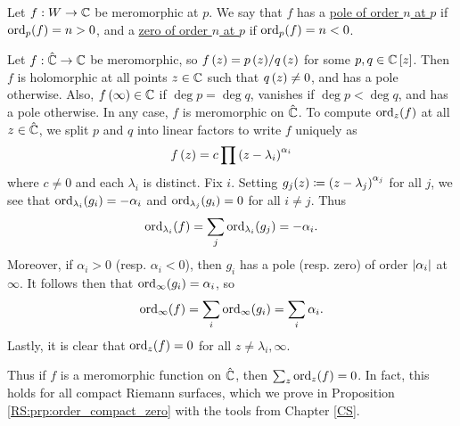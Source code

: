 \documentclass[../Moduli_Spaces_of_Riemann_Surfaces.tex]{subfiles}
\begin{document}
    \begin{definition}
        Let $f:W\to\mathbb{C}$ be meromorphic at $p$. We say that $f$ has a \ul{pole of order $n$ at $p$} if $\operatorname{ord}_p\!\left(f\right)=n>0$, and a \ul{zero of order $n$ at $p$} if $\operatorname{ord}_p\!\left(f\right)=n<0$.
    \end{definition}
    \begin{example}\label{RS:exa:order_Riemann_sphere_zero}
        Let $f:\hat{\mathbb{C}}\to\mathbb{C}$ be meromorphic, so $f\left(z\right)=p\left(z\right)\!/q\left(z\right)$ for some $p,q\in\mathbb{C}\left[z\right]$. Then $f$ is holomorphic at all points $z\in\mathbb{C}$ such that $q\left(z\right)\neq0$, and has a pole otherwise. Also, $f\left(\infty\right)\in\mathbb{C}$ if $\deg p=\deg q$, vanishes if $\deg p<\deg q$, and has a pole otherwise. In any case, $f$ is meromorphic on $\hat{\mathbb{C}}$. To compute $\operatorname{ord}_z\!\left(f\right)$ at all $z\in\hat{\mathbb{C}}$, we split $p$ and $q$ into linear factors to write $f$ uniquely as
        \begin{equation*}
            f\left(z\right)=c\prod\left(z-\lambda_i\right)^{\alpha_i}
        \end{equation*}
        where $c\neq0$ and each $\lambda_i$ is distinct. Fix $i$. Setting $g_j\!\left(z\right)\coloneqq\left(z-\lambda_j\right)^{\alpha_j}$ for all $j$, we see that $\operatorname{ord}_{\lambda_i}\!\left(g_i\right)=-\alpha_i$ and $\operatorname{ord}_{\lambda_j}\!\left(g_i\right)=0$ for all $i\neq j$. Thus
        \begin{equation*}
            \operatorname{ord}_{\lambda_i}\!\left(f\right)=\sum_j\operatorname{ord}_{\lambda_i}\!\left(g_j\right)=-\alpha_i.
        \end{equation*}
        Moreover, if $\alpha_i>0$ (resp. $\alpha_i<0$), then $g_i$ has a pole (resp. zero) of order $\left|\alpha_i\right|$ at $\infty$. It follows then that $\operatorname{ord}_\infty\!\left(g_i\right)=\alpha_i$, so
        \begin{equation*}
            \operatorname{ord}_\infty\!\left(f\right)=\sum_i\operatorname{ord}_\infty\!\left(g_i\right)=\sum_i\alpha_i.
        \end{equation*}
        Lastly, it is clear that $\operatorname{ord}_z\!\left(f\right)=0$ for all $z\neq \lambda_i,\infty$.\exqed
    \end{example}
    \begin{remark}
        Thus if $f$ is a meromorphic function on $\hat{\mathbb{C}}$, then $\sum_z\operatorname{ord}_z\!\left(f\right)=0$. In fact, this holds for all compact Riemann surfaces, which we prove in Proposition \ref{RS:prp:order_compact_zero} with the tools from Chapter \ref{CS}.\exqed
    \end{remark}
\end{document}
